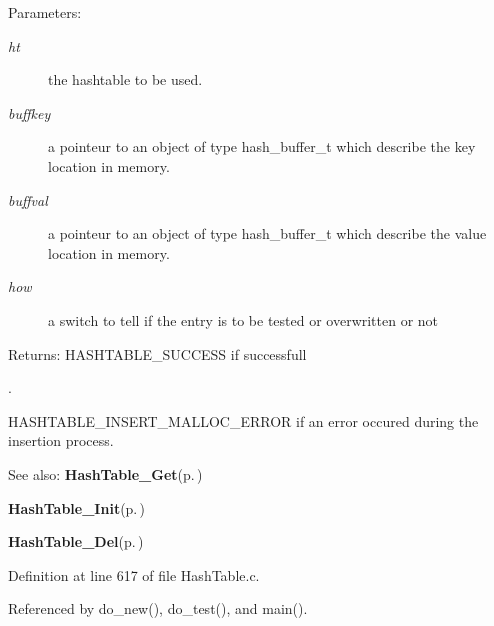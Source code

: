 \begin{Desc}
\item[Parameters:]
\begin{description}
\item[{\em ht}]the hashtable to be used. \item[{\em buffkey}]a pointeur to an object of type hash\_\-buffer\_\-t which describe the key location in memory. \item[{\em buffval}]a pointeur to an object of type hash\_\-buffer\_\-t which describe the value location in memory. \item[{\em how}]a switch to tell if the entry is to be tested or overwritten or not\end{description}
\end{Desc}
\begin{Desc}
\item[Returns:]HASHTABLE\_\-SUCCESS if successfull\par
. 

HASHTABLE\_\-INSERT\_\-MALLOC\_\-ERROR if an error occured during the insertion process.\end{Desc}
\begin{Desc}
\item[See also:]{\bf Hash\-Table\_\-Get}{\rm (p.\,\pageref{group__HashTableExportedFunctions_ga2})} 

{\bf Hash\-Table\_\-Init}{\rm (p.\,\pageref{group__HashTableExportedFunctions_ga0})} 

{\bf Hash\-Table\_\-Del}{\rm (p.\,\pageref{group__HashTableExportedFunctions_ga3})} \end{Desc}


Definition at line 617 of file Hash\-Table.c.

Referenced by do\_\-new(), do\_\-test(), and main().